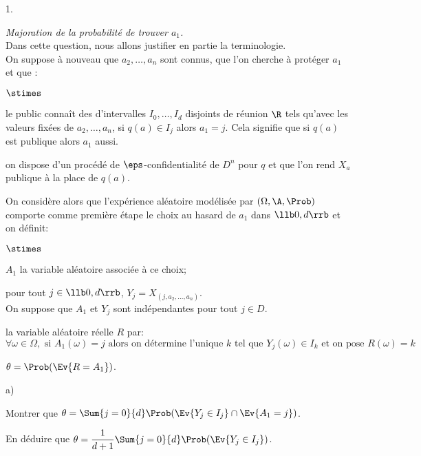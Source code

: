 \documentclass[11pt]{article}%
\begin{document}
\begin{noliste}{1.}
  \setcounter{enumi}{12} %
  \setlength{\itemsep}{4mm}
\item {\em Majoration de la probabilité de trouver $a_1$.}\\
  Dans cette question, nous allons justifier en partie la
  terminologie.\\
  On suppose à nouveau que $a_2, \ldots ,a_n$ sont connus, que l'on
  cherche à protéger $a_1$ et que :
  \begin{noliste}{$\stimes$}
  \item le public connaît des d'intervalles $I_0,\ldots,I_d$ disjoints
    de réunion $\R$ tels qu'avec les valeurs fixées de $a_2, \ldots,
    a_n$, si $q(a) \in I_j$ alors $a_1 = j$. Cela signifie que si
    $q(a)$ est publique alors $a_1$ aussi.
  \item on dispose d'un procédé de $\eps$-confidentialité de $D^n$
    pour $q$ et que l'on rend $X_a$ publique à la place de $q(a)$.
  \end{noliste}
  On considère alors que l'expérience aléatoire modélisée par
  $(\Omega, \A, \Prob)$ comporte comme première étape le choix au
  hasard de $a_1$ dans $\llb 0, d \rrb$ et on définit:
  \begin{noliste}{$\stimes$}
  \item $A_1$ la variable aléatoire associée à ce choix;
  \item pour tout $j \in \llb 0, d \rrb$, $Y_j = X_{(j, a_2, \ldots,
      a_n)}$. \\
    On suppose que $A_1$ et $Y_j$ sont indépendantes pour tout $j\in
    D$.
  \item la variable aléatoire réelle $R$ par:
    \[
    \forall \omega\in\Omega, \text{ si } A_1(\omega) = j \text{ alors
      on détermine l'unique } k \text{ tel que } Y_j(\omega)\in I_k
    \text{ et on pose } R(\omega)=k
    \]
  \item $\theta = \Prob(\Ev{R = A_1})$.
  \end{noliste}




  \begin{noliste}{a)}
    \setlength{\itemsep}{2mm} %
  \item Montrer que $\theta = \Sum{j=0}{d} \Prob(\Ev{Y_j\in I_j} \cap
    \Ev{A_1=j})$.

    

  \item En déduire que $\theta = \dfrac{1}{d+1} \Sum{j=0}{d}
    \Prob(\Ev{Y_j \in I_j})$.


\end{noliste}
\end{noliste}
\end{document}

